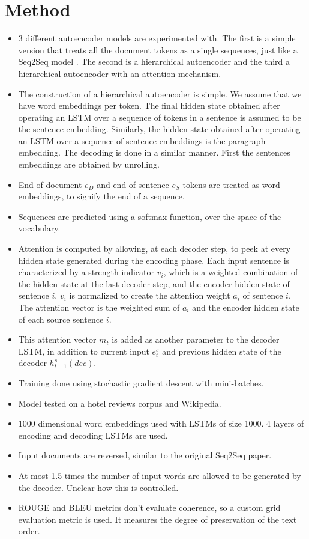 \documentclass[12pt]{scrartcl}
\begin{document}
\section{Method}
  \begin{itemize}
    \item 3 different autoencoder models are experimented with. The first is a simple version that treats all the document tokens as a single sequences, just like a Seq2Seq model \cite{sutskever2014sequence}. The second is a hierarchical autoencoder and the third a hierarchical autoencoder with an attention mechanism.
    \item The construction of a hierarchical autoencoder is simple. We assume that we have word embeddings per token. The final hidden state obtained after operating an LSTM over a sequence of tokens in a sentence is assumed to be the sentence embedding. Similarly, the hidden state obtained after operating an LSTM over a sequence of sentence embeddings is the paragraph embedding. The decoding is done in a similar manner. First the sentences embeddings are obtained by unrolling.
    \item End of document $e_D$ and end of sentence $e_S$ tokens are treated as word embeddings, to signify the end of a sequence.
    \item Sequences are predicted using a softmax function, over the space of the vocabulary.
    \item Attention is computed by allowing, at each decoder step, to peek at every hidden state generated during the encoding phase. Each input sentence is characterized by a strength indicator $v_i$, which is a weighted combination of the hidden state at the last decoder step, and the encoder hidden state of sentence $i$. $v_i$ is normalized to create the attention weight $a_i$ of sentence $i$. The attention vector is the weighted sum of $a_i$ and the encoder hidden state of each source sentence $i$.
    \item This attention vector $m_t$ is added as another parameter to the decoder LSTM, in addition to current input $e^s_t$ and previous hidden state of the decoder $h^s_{t-1} (dec)$.
    \item Training done using stochastic gradient descent with mini-batches.
    \item Model tested on a hotel reviews corpus and Wikipedia.
    \item 1000 dimensional word embeddings used with LSTMs of size 1000. 4 layers of encoding and decoding LSTMs are used. 
    \item Input documents are reversed, similar to the original Seq2Seq paper. \cite{sutskever2014sequence}
    \item At most 1.5 times the number of input words are allowed to be generated by the decoder. Unclear how this is controlled.
    \item ROUGE and BLEU metrics don't evaluate coherence, so a custom grid evaluation metric is used. It measures the degree of preservation of the text order.
  \end{itemize}
\end{document}
